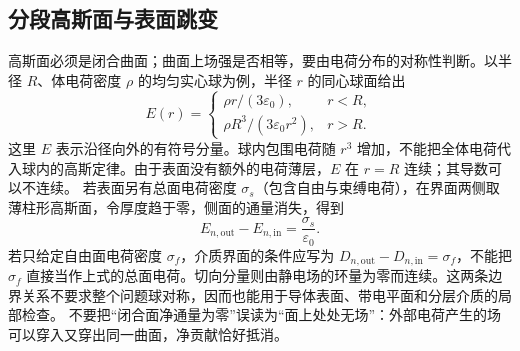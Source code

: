 \subsection{分段高斯面与表面跳变}
高斯面必须是闭合曲面；曲面上场强是否相等，要由电荷分布的对称性判断。以半径 $R$、体电荷密度 $\rho$ 的均匀实心球为例，半径 $r$ 的同心球面给出
\[
 E(r)=\begin{cases}\rho r/(3\varepsilon_0),&r<R,\\
 \rho R^3/(3\varepsilon_0r^2),&r>R.
 \end{cases}
\]
这里 $E$ 表示沿径向外的有符号分量。球内包围电荷随 $r^3$ 增加，不能把全体电荷代入球内的高斯定律。由于表面没有额外的电荷薄层，$E$ 在 $r=R$ 连续；其导数可以不连续。
若表面另有总面电荷密度 $\sigma_s$（包含自由与束缚电荷），在界面两侧取薄柱形高斯面，令厚度趋于零，侧面的通量消失，得到
\[
 E_{n,\mathrm{out}}-E_{n,\mathrm{in}}=\frac{\sigma_s}{\varepsilon_0}.
\]
若只给定自由面电荷密度 $\sigma_f$，介质界面的条件应写为 $D_{n,\mathrm{out}}-D_{n,\mathrm{in}}=\sigma_f$，不能把 $\sigma_f$ 直接当作上式的总面电荷。切向分量则由静电场的环量为零而连续。这两条边界关系不要求整个问题球对称，因而也能用于导体表面、带电平面和分层介质的局部检查。
不要把“闭合面净通量为零”误读为“面上处处无场”：外部电荷产生的场可以穿入又穿出同一曲面，净贡献恰好抵消。

